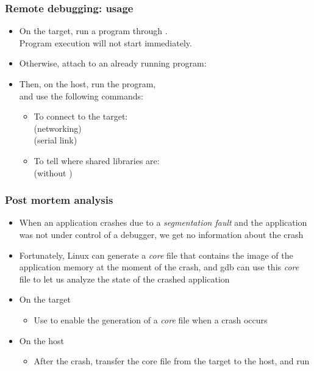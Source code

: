 \begin{frame}
  \frametitle{Remote debugging: usage}
  \begin{itemize}
  \item On the target, run a program through .\\
    Program execution will not start immediately.\\
  \item Otherwise, attach  to an already running program:\\
  \item Then, on the host, run the  program,\\
    and use the following  commands:
    \begin{itemize}
    \item To connect to the target:\\
       (networking)\\
       (serial link)
    \item To tell  where shared libraries are:\\
       (without )
    \end{itemize}
  \end{itemize}
\end{frame}

\begin{frame}
  \frametitle{Post mortem analysis}
  \begin{itemize}
  \item When an application crashes due to a {\em segmentation fault}
    and the application was not under control of a debugger, we get no
    information about the crash
  \item Fortunately, Linux can generate a {\em core} file that
    contains the image of the application memory at the moment of the
    crash, and gdb can use this {\em core} file to let us analyze the
    state of the crashed application
  \item On the target
    \begin{itemize}
    \item Use  to enable the generation of a
      {\em core} file when a crash occurs
    \end{itemize}
  \item On the host
    \begin{itemize}
    \item After the crash, transfer the core file from the target to
      the host, and run
    \end{itemize}
  \end{itemize}
\end{frame}

